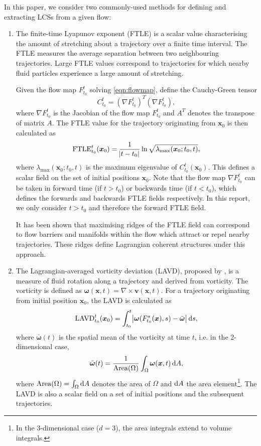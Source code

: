 \documentclass[a4paper, fontsize=12pt]{article}
\begin{document}
In this paper, we consider two commonly-used methods for defining and extracting LCSs from a given flow:
\begin{enumerate}
\item The finite-time Lyapunov exponent (FTLE) is a scalar value characterising the amount of stretching about a trajectory over a finite time interval. The FTLE measures the average separation between two neighbouring trajectories. Large FTLE values correspond to trajectories for which nearby fluid particles experience a large amount of stretching.

Given the flow map \(F_{t_0}^t\) solving \eqref{eqn:flowmap}, define the Cauchy-Green tensor 
\[
C_{t_0}^t = \left(\nabla F_{t_0}^t\right)^T\left(\nabla F_{t_0}^t\right),
\]
where \(\nabla F_{t_0}^t\) is the Jacobian of the flow map \(F_{t_0}^t\) and \(A^T\) denotes the transpose of matrix \(A\). The FTLE value for the trajectory originating from \(\bm{x}_0\) is then calculated as 
\[
\mathrm{FTLE}_{t_0}^{t}(\bm{x}_0) = \frac{1}{\abs{t - t_0}}\ln\sqrt{\lambda_{\text{max}}(\bm{x}_0; t_0, t)},
\]
where \(\lambda_{\text{max}}(\bm{x}_0; t_0, t)\) is the maximum eigenvalue of \(C_{t_0}^t(\bm{x}_0)\). This defines a scalar field on the set of initial positions \(\bm{x}_0\). Note that the flow map \(\nabla F_{t_0}^{t}\) can be taken in forward time (if \(t > t_0\)) or backwards time (if \(t < t_0\)), which defines the forwards and backwards FTLE fields respectively. In this report, we only consider \(t > t_0\) and therefore the forward FTLE field. 

It has been shown \citep{shadden_2005_ftle} that maximising ridges of the FTLE field can correspond to flow barriers and manifolds within the flow which attract or repel nearby trajectories. These ridges define Lagrangian coherent structures under this approach. 


\item The Lagrangian-averaged vorticity deviation (LAVD), proposed by \cite{haller_2016_lavd}, is a measure of fluid rotation along a trajectory and derived from vorticity. The vorticity is defined as \(\bm{\omega}(\bm{x},t) = \nabla\times\bm{v}(\bm{x},t)\). For a trajectory originating from initial position \(\bm{x}_0\), the LAVD is calculated as
\[
\mathrm{LAVD}_{t_0}^{t}(\bm{x}_0) = \int_{t_0}^{t}{\abs{\bm{\omega}(F_{t_0}^{s}(\bm{x}), s) - \bar{\bm{\omega}}}\dif s},
\]
where \(\bar{\bm{\omega}}(t)\) is the spatial mean of the vorticity at time \(t\), i.e. in the 2-dimensional case,
\[
\bar{\bm{\omega}}(t) = \frac{1}{\mathrm{Area}(\Omega)}\int_{\Omega}{\bm{\omega}(\bm{x},t)\dif A},
\]
where \(\mathrm{Area}(\Omega) = \int_{\Omega}{\dif A}\) denotes the area of \(\Omega\) and \(\dif A\) the area element\footnote{In the 3-dimensional case (\(d = 3\)), the area integrals extend to volume integrals.}. The LAVD is also a scalar field on a set of initial positions and the subsequent trajectories.


\end{enumerate}
\end{document}
